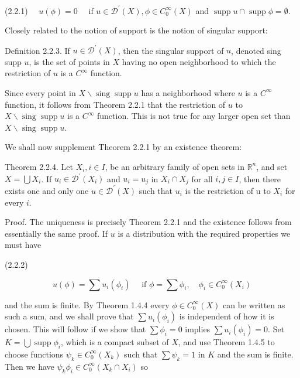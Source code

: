 (2.2.1) $\quad u(\phi)=0 \quad$ if $u \in \mathscr{D}^{\prime}(X), \phi \in C_{0}^{\infty}(X)$ and $\operatorname{supp} u \cap \operatorname{supp} \phi=\emptyset$.

Closely related to the notion of support is the notion of singular support:

Definition 2.2.3. If $u \in \mathscr{D}^{\prime}(X)$, then the singular support of $u$, denoted sing supp $u$, is the set of points in $X$ having no open neighborhood to which the restriction of $u$ is a $C^{\infty}$ function.

Since every point in $X \backslash \operatorname{sing} \operatorname{supp} u$ has a neighborhood where $u$ is a $C^{\infty}$ function, it follows from Theorem 2.2.1 that the restriction of $u$ to $X \backslash \operatorname{sing} \operatorname{supp} u$ is a $C^{\infty}$ function. This is not true for any larger open set than $X \backslash \operatorname{sing} \operatorname{supp} u$.

We shall now supplement Theorem 2.2.1 by an existence theorem:

Theorem 2.2.4. Let $X_{i}, i \in I$, be an arbitrary family of open sets in $\mathbb{R}^{n}$, and set $X=\bigcup X_{i}$. If $u_{i} \in \mathscr{D}^{\prime}\left(X_{i}\right)$ and $u_{i}=u_{j}$ in $X_{i} \cap X_{j}$ for all $i, j \in I$, then there exists one and only one $u \in \mathscr{D}^{\prime}(X)$ such that $u_{i}$ is the restriction of u to $X_{i}$ for every $i$.

Proof. The uniqueness is precisely Theorem 2.2.1 and the existence follows from essentially the same proof. If $u$ is a distribution with the required properties we must have

(2.2.2)

\[
u(\phi)=\sum u_{i}\left(\phi_{i}\right) \quad \text { if } \phi=\sum \phi_{i}, \quad \phi_{i} \in C_{0}^{\infty}\left(X_{i}\right)
\]

and the sum is finite. By Theorem 1.4.4 every $\phi \in C_{0}^{\infty}(X)$ can be written as such a sum, and we shall prove that $\sum u_{i}\left(\phi_{i}\right)$ is independent of how it is chosen. This will follow if we show that $\sum \phi_{i}=0$ implies $\sum u_{i}\left(\phi_{i}\right)=0$. Set $K=\bigcup \operatorname{supp} \phi_{i}$, which is a compact subset of $X$, and use Theorem 1.4.5 to choose functions $\psi_{k} \in C_{0}^{\infty}\left(X_{k}\right)$ such that $\sum \psi_{k}=1$ in $K$ and the sum is finite. Then we have $\psi_{k} \phi_{i} \in C_{0}^{\infty}\left(X_{k} \cap X_{i}\right)$ so

